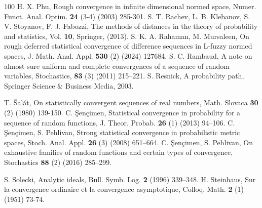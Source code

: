\documentclass[reqno]{amsart}
\begin{document}
\begin{thebibliography}{100}
		 H. X. Phu, Rough convergence in infinite dimensional normed space, Numer. Funct. Anal. Optim. {\textbf{24}} (3-4) (2003) 285-301.
		 S. T. Rachev, L. B. Klebanov, S. V. Stoyanov, F. J. Fabozzi, The methods of distances in the theory of probability and statistics, Vol. \textbf{10}, Springer, (2013).
		 S. K. A. Rahaman, M. Mursaleen, On rough deferred statistical convergence of difference sequences in L-fuzzy normed spaces, J. Math. Anal. Appl. {\textbf{530}} (2) (2024) 127684.
		 S. C. Rambaud, A note on almost sure uniform and complete convergences of a sequence of random variables, Stochastics, \textbf{83} (3) (2011) {215--221}.
		 S. Resnick, A probability path, Springer Science \& Business Media, 2003.
		
		
		 T. \v{S}al\'{a}t, On statistically convergent sequences of real numbers, Math. Slovaca {\textbf{30}} (2) (1980) 139-150.
		 C. {\c{S}}en{\c{c}}imen, Statistical convergence in probability for a sequence of random functions, J. Theor. Probab. \textbf{{26}} (1) (2013) {94--106}.
		 C. {\c{S}}en{\c{c}}imen, S. Pehlivan, Strong statistical convergence in probabilistic metric spaces, Stoch. Anal. Appl. \textbf{{26}} (3) (2008) 651--664.
		 C. {\c{S}}en{\c{c}}imen, S. Pehlivan, On exhaustive families of random functions and certain types of convergence, Stochastics \textbf{{88}} (2) (2016) {285--299}.
		
		 S. Solecki, Analytic ideals, Bull. Symb. Log. \textbf{2} (1996) 339–348.
		 H. Steinhaus, Sur la convergence ordinaire et la convergence asymptotique, Colloq. Math. {\textbf{2}}  (1) (1951) 73-74.
		
		
		
	\end{thebibliography}
	
	
	
\end{document}
